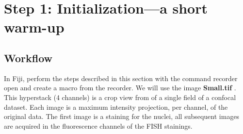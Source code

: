\section{Step 1: Initialization---a short warm-up}

\subsection{Workflow}

In Fiji, perform the steps described in this section with the command recorder open and create a macro from the recorder.
We will use the image \textbf{Small.tif} .\\

This hyperstack (4 channels) is a crop view from of a single field of a confocal dataset.
Each image is a maximum intensity projection, per channel, of the original data. 
The first image is a staining for the nuclei, all subsequent images are acquired in the fluorescence channels of the FISH stainings.

